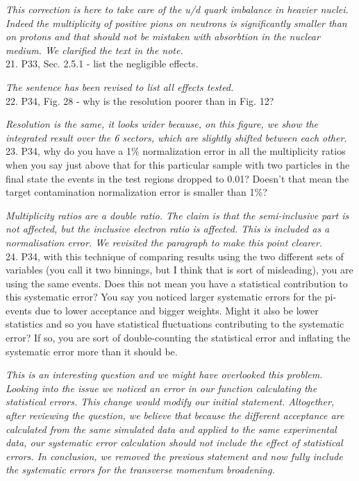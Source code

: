 \documentclass[12pt]{article}
\begin{document}
{\it This correction is here to take care of the u/d quark imbalance in heavier nuclei.
Indeed the multiplicity of positive pions on neutrons is significantly smaller than on protons and that
should not be mistaken with absorbtion in the nuclear medium. We clarified the text in the
note.} \\


21.
P33, Sec. 2.5.1 - list the negligible effects.

{\it The sentence has been revised to list all effects tested.} \\

22.
P34, Fig. 28 - why is the resolution poorer than in Fig. 12?

{\it Resolution is the same, it looks wider because, on this figure, we show the integrated 
result over the 6 sectors, which are slightly shifted between each other.} \\


23.
P34, why do you have a 1\% normalization error in all the multiplicity ratios when you say just 
above that for this particular sample with two particles in the final state the events in the test 
regions dropped to 0.01?  Doesn’t that mean the target contamination normalization error is 
smaller than 1\%?

{\it Multiplicity ratios are a double ratio. The claim is that the semi-inclusive part 
is not affected, but the inclusive electron ratio is affected. This is included
as a normalisation error. We revisited the paragraph to make this point clearer.} \\


24.
P34, with this technique of comparing results using the two different sets of variables (you 
call it two binnings, but I think that is sort of misleading), you are using the same events.  
Does this not mean you have a statistical contribution to this systematic error?  You say you 
noticed larger systematic errors for the pi- events due to lower acceptance and bigger 
weights.  Might it also be lower statistics and so you have statistical fluctuations contributing 
to the systematic error?  If so, you are sort of double-counting the statistical error and 
inflating the systematic error more than it should be.  

{\it This is an interesting question and we might have overlooked this problem. Looking into the
issue we noticed an error in our function calculating the statistical errors. This change 
would modify our initial statement. Altogether, after reviewing the question, we believe that 
because the different acceptance are calculated from the same simulated data and applied to 
the same experimental data, our systematic error calculation should not include the effect 
of statistical errors. In conclusion, we removed the previous statement and now fully include 
the systematic errors for the transverse momentum broadening.} \\
\end{document}
